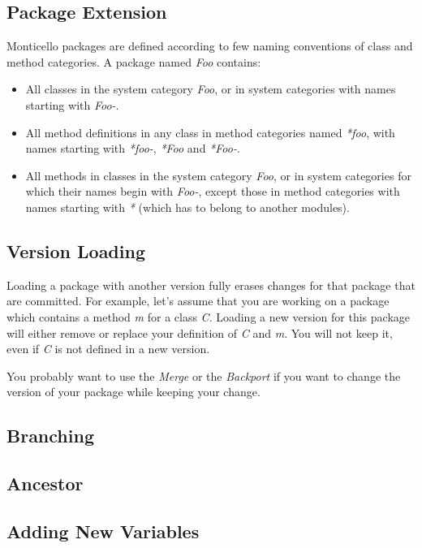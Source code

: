\documentclass[a4paper,10pt,twoside]{book}
\begin{document}
\subsection{Package Extension}  
Monticello packages are defined according to few naming conventions of class and method categories. A package named \emph{Foo} contains:

\begin{itemize}
\item All classes in the system category \emph{Foo}, or in system categories with names starting with \emph{Foo-}.
\item All method definitions in any class in method categories named \emph{*foo}, with names starting with \emph{*foo-}, \emph{*Foo} and \emph{*Foo-}.
\item All methods in classes in the system category \emph{Foo}, or in system categories for which their names begin with \emph{Foo-}, except those in method categories with names starting with \emph{*} (which has to belong to another modules).
\end{itemize}


\subsection{Version Loading}

Loading a package with another version fully erases changes for that package that are committed. For example, let's assume that you are working on a package which contains a method \emph{m} for a class \emph{C}. Loading a new version for this package will either remove or replace your definition of \emph{C} and \emph{m}. You will not keep it, even if \emph{C} is not defined in a new version.

You probably want to use the \emph{Merge} or the \emph{Backport} if you want to change the version of your package while keeping your change.

\subsection{Branching}

\subsection{Ancestor}

\subsection{Adding New Variables}
\end{document}
